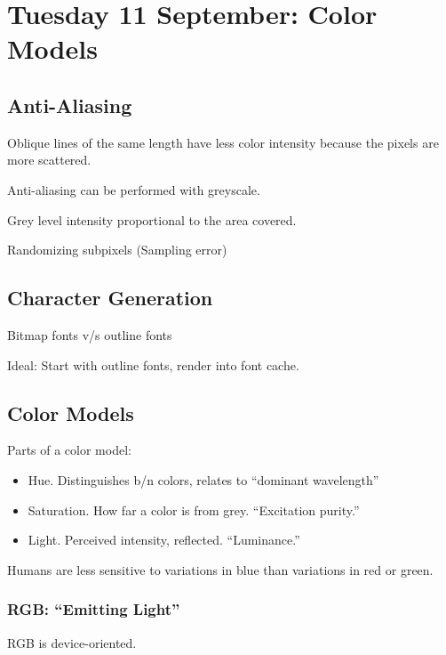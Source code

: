 \section{Tuesday 11 September:  Color Models}

\subsection{Anti-Aliasing}

Oblique lines of the same length have less color intensity because the pixels are more scattered.  

Anti-aliasing can be performed with greyscale.

Grey level intensity proportional to the area covered.  

Randomizing subpixels (Sampling error)

\subsection{Character Generation}

Bitmap fonts v/s outline fonts

Ideal:  Start with outline fonts, render into font cache.  

\subsection{Color Models}

Parts of a color model:

\begin{itemize}
	\item Hue.  Distinguishes b/n colors, relates to ``dominant wavelength''
	\item Saturation.  How far a color is from grey.  ``Excitation purity.''
	\item Light.  Perceived intensity, reflected.  ``Luminance.''
\end{itemize}

Humans are less sensitive to variations in blue than variations in red or green.  

\subsubsection{RGB:  ``Emitting Light''}

RGB is device-oriented.  

\


